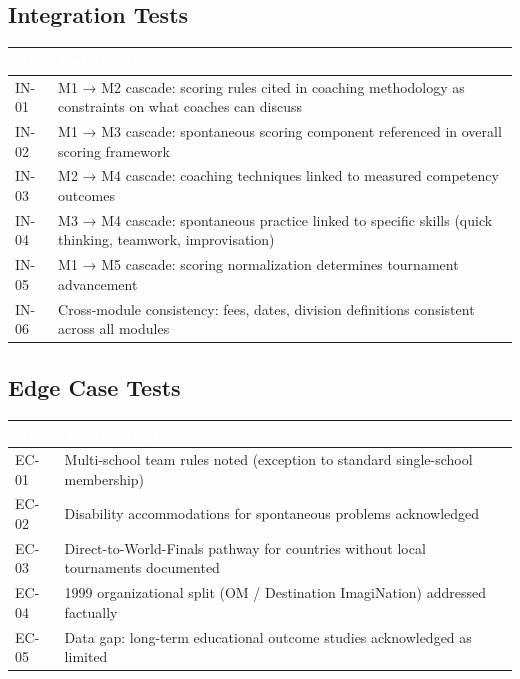 \documentclass[11pt,letterpaper]{article}
\newcommand{\tableheader}[1]{\textbf{\sffamily\textcolor{white}{#1}}}
\begin{document}
\subsection{Integration Tests}

\begin{center}
\begin{tabularx}{\textwidth}{C{1.2cm}X}
\toprule
{}
\tableheader{ID} & \tableheader{Test Description} \\
\midrule
IN-01 & M1 → M2 cascade: scoring rules cited in coaching methodology as constraints on what coaches can discuss \\
IN-02 & M1 → M3 cascade: spontaneous scoring component referenced in overall scoring framework \\
IN-03 & M2 → M4 cascade: coaching techniques linked to measured competency outcomes \\
IN-04 & M3 → M4 cascade: spontaneous practice linked to specific skills (quick thinking, teamwork, improvisation) \\
IN-05 & M1 → M5 cascade: scoring normalization determines tournament advancement \\
IN-06 & Cross-module consistency: fees, dates, division definitions consistent across all modules \\
\bottomrule
\end{tabularx}
\end{center}

\subsection{Edge Case Tests}

\begin{center}
\begin{tabularx}{\textwidth}{C{1.2cm}X}
\toprule
{}
\tableheader{ID} & \tableheader{Test Description} \\
\midrule
EC-01 & Multi-school team rules noted (exception to standard single-school membership) \\
EC-02 & Disability accommodations for spontaneous problems acknowledged \\
EC-03 & Direct-to-World-Finals pathway for countries without local tournaments documented \\
EC-04 & 1999 organizational split (OM / Destination ImagiNation) addressed factually \\
EC-05 & Data gap: long-term educational outcome studies acknowledged as limited \\
\bottomrule
\end{tabularx}
\end{center}
\end{document}
